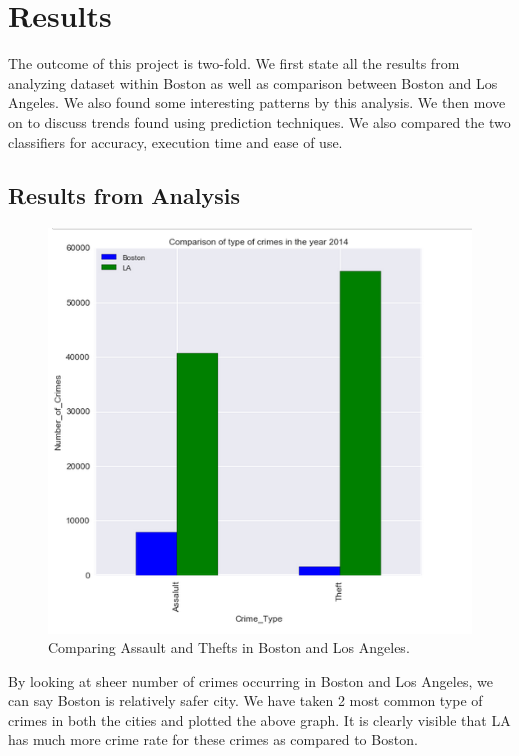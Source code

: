 \documentclass[journal, a4paper]{IEEEtran}
\begin{document}
\section{Results}

The outcome of this project is two-fold. We first state all the results from analyzing dataset within Boston as well as comparison between Boston and Los Angeles. We also found some interesting patterns by this analysis. We then move on to discuss trends found using prediction techniques. We also compared the two classifiers for accuracy, execution time and ease of use.

\subsection{Results from Analysis}

    \begin{figure}[!hbt]
        \begin{center}
        \includegraphics[width=\columnwidth]{boston-la-twotype.png}
        \caption{Comparing Assault and Thefts in Boston and Los Angeles.}
        \label{fig:tf_plot}
        \end{center}
    \end{figure}

By looking at sheer number of crimes occurring in Boston and Los Angeles, we can say Boston is relatively safer city.  We have taken 2 most common type of crimes in both the cities and plotted the above graph. It is clearly visible that LA has much more crime rate for these crimes as compared to Boston.
 
\end{document}
